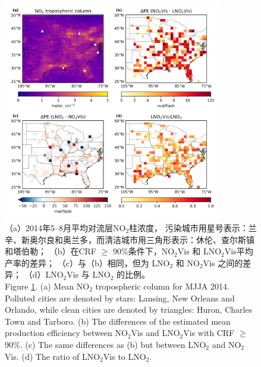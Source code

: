 \begin{figure}[H]
\centering
\includegraphics[width=0.85\textwidth]{./figures/us_delta.png}
\caption{（a）2014年5--8月平均对流层NO$_2$柱浓度，
污染城市用星号表示：兰辛、新奥尔良和奥兰多，而清洁城市用三角形表示：休伦、查尔斯镇和塔伯勒；
（b）在CRF $\geq$ 90\%条件下，NO$_2$Vis 和 LNO$_2$Vis平均产率的差异；
（c）与（b）相同，但为 LNO$_2$ 和 NO$_2$Vis 之间的差异；
（d）LNO$_2$Vis 与 LNO$_2$ 的比例。\\
Figure \ref{fig:us_delta}.
(a) Mean NO$_2$ tropospheric column for MJJA 2014.
Polluted cities are denoted by stars: Lansing, New Orleans and Orlando, while clean cities are denoted by triangles: Huron, Charles Town and Tarboro.
(b) The differences of the estimated mean production efficiency between NO$_2$Vis and LNO$_2$Vis with CRF $\geq$ 90\%.
(c) The same differences as (b) but between LNO$_2$ and NO$_2$Vis.
(d) The ratio of LNO$_2$Vis to LNO$_2$.
}
\label{fig:us_delta}
\end{figure}


